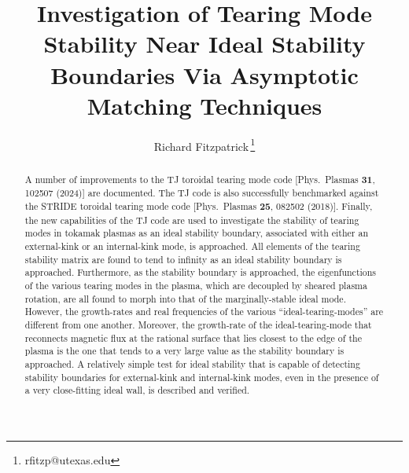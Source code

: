 \documentclass[12pt,prb,aps]{revtex4-1}
\begin{document}
\title{Investigation of  Tearing Mode Stability Near Ideal Stability Boundaries Via Asymptotic Matching Techniques}
\author{Richard Fitzpatrick\,\footnote{rfitzp@utexas.edu}}

\begin{abstract}
A number of improvements to the TJ toroidal tearing mode code [Phys.\ Plasmas {\bf 31}, 102507 (2024)] are documented. The TJ
code is also successfully benchmarked against the STRIDE toroidal tearing mode code [Phys.\ Plasmas {\bf 25}, 082502 (2018)]. Finally, the 
 new capabilities of the TJ code are used to investigate the stability of tearing modes in tokamak plasmas as
an ideal stability boundary, associated with either an external-kink or an internal-kink mode, is  approached. 
All elements of the tearing stability matrix are found to tend to infinity as an ideal stability boundary is approached. 
Furthermore, as the stability boundary is approached, the eigenfunctions of the various tearing modes in the plasma, which are decoupled by sheared plasma rotation,
are all found to morph into that of the marginally-stable ideal mode. However, the growth-rates and real frequencies of the various ``ideal-tearing-modes'' are different from one another.
Moreover, the growth-rate of the ideal-tearing-mode that reconnects magnetic flux at the rational surface that lies closest to the
edge of the plasma is the one that tends to a very large value as the stability boundary is approached. A relatively simple test for
ideal stability that is capable of detecting stability boundaries for external-kink and internal-kink modes, even in the presence of
a very close-fitting ideal wall, is described and verified.

\end{abstract}
\maketitle
\end{document}
